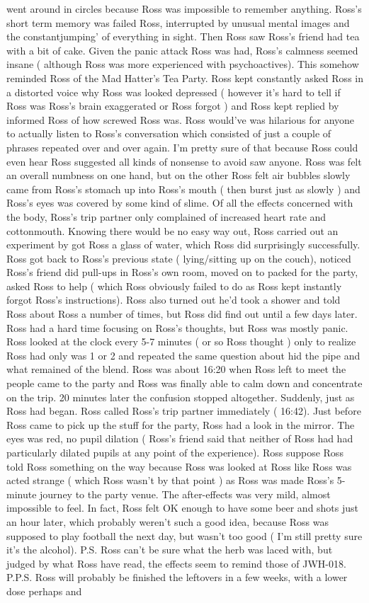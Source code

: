 \documentclass[12pt]{book}
\begin{document}
went around in circles because Ross was impossible to remember anything. Ross's short term memory was failed Ross, interrupted by unusual mental images and the constantjumping' of everything in sight. Then Ross saw Ross's friend had tea with a bit of cake. Given the panic attack Ross was had, Ross's calmness seemed insane ( although Ross was more experienced with psychoactives). This somehow reminded Ross of the Mad Hatter's Tea Party. Ross kept constantly asked Ross in a distorted voice why Ross was looked depressed ( however it's hard to tell if Ross was Ross's brain exaggerated or Ross forgot ) and Ross kept replied by informed Ross of how screwed Ross was. Ross would've was hilarious for anyone to actually listen to Ross's conversation which consisted of just a couple of phrases repeated over and over again. I'm pretty sure of that because Ross could even hear Ross suggested all kinds of nonsense to avoid saw anyone. Ross was felt an overall numbness on one hand, but on the other Ross felt air bubbles slowly came from Ross's stomach up into Ross's mouth ( then burst just as slowly ) and Ross's eyes was covered by some kind of slime. Of all the effects concerned with the body, Ross's trip partner only complained of increased heart rate and cottonmouth. Knowing there would be no easy way out, Ross carried out an experiment by got Ross a glass of water, which Ross did surprisingly successfully. Ross got back to Ross's previous state ( lying/sitting up on the couch), noticed Ross's friend did pull-ups in Ross's own room, moved on to packed for the party, asked Ross to help ( which Ross obviously failed to do as Ross kept instantly forgot Ross's instructions). Ross also turned out he'd took a shower and told Ross about Ross a number of times, but Ross did find out until a few days later. Ross had a hard time focusing on Ross's thoughts, but Ross was mostly panic. Ross looked at the clock every 5-7 minutes ( or so Ross thought ) only to realize Ross had only was 1 or 2 and repeated the same question about hid the pipe and what remained of the blend. Ross was about 16:20 when Ross left to meet the people came to the party and Ross was finally able to calm down and concentrate on the trip. 20 minutes later the confusion stopped altogether. Suddenly, just as Ross had began. Ross called Ross's trip partner immediately ( 16:42). Just before Ross came to pick up the stuff for the party, Ross had a look in the mirror. The eyes was red, no pupil dilation ( Ross's friend said that neither of Ross had had particularly dilated pupils at any point of the experience). Ross suppose Ross told Ross something on the way because Ross was looked at Ross like Ross was acted strange ( which Ross wasn't by that point ) as Ross was made Ross's 5-minute journey to the party venue. The after-effects was very mild, almost impossible to feel. In fact, Ross felt OK enough to have some beer and shots just an hour later, which probably weren't such a good idea, because Ross was supposed to play football the next day, but wasn't too good ( I'm still pretty sure it's the alcohol). P.S. Ross can't be sure what the herb was laced with, but judged by what Ross have read, the effects seem to remind those of JWH-018. P.P.S. Ross will probably be finished the leftovers in a few weeks, with a lower dose perhaps and 
\end{document}
